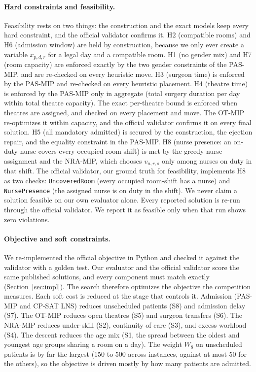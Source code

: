 \documentclass[11pt]{article}
\newcommand{\Sc}[1]{\textsf{S#1}}
\newcommand{\Hc}[1]{\textsf{H#1}}
\begin{document}
	\paragraph{Hard constraints and feasibility.}
	Feasibility rests on two things: the construction and the exact models keep every hard constraint,
	and the official validator confirms it. \Hc2 (compatible rooms) and \Hc6 (admission window) are held by
	construction, because we only ever create a variable $x_{p,d,r}$ for a legal day and a compatible
	room. \Hc1 (no gender mix) and \Hc7 (room capacity) are enforced exactly by the two gender
	constraints of the PAS-MIP, and are re-checked on every heuristic move. \Hc3 (surgeon time) is enforced by the PAS-MIP and re-checked on every heuristic placement.
	\Hc4 (theatre time) is enforced by the PAS-MIP only in aggregate (total surgery duration per day
	within total theatre capacity). The exact per-theatre bound is enforced when theatres are assigned, and checked on every placement and move. The OT-MIP re-optimizes it within capacity, and the official validator confirms it on every final solution. \Hc5 (all
	mandatory admitted) is secured by the construction, the ejection repair, and the equality
	constraint in the PAS-MIP. \Hc8 (nurse presence: an on-duty nurse covers every occupied room-shift)
	is met by the greedy nurse assignment and the NRA-MIP, which chooses $v_{n,r,s}$ only among nurses on
	duty in that shift. The official validator, our ground truth for feasibility, implements \Hc8 as two
	checks: \texttt{UncoveredRoom} (every occupied room-shift has a nurse) and \texttt{NursePresence}
	(the assigned nurse is on duty in the shift). We never claim a solution feasible on our own evaluator alone. Every reported solution is re-run through the official validator. We report it as feasible only when that run shows zero violations.
	
	\paragraph{Objective and soft constraints.}
	We re-implemented the official objective in Python and checked it against the validator with a golden test. Our evaluator and the official validator score the same published solutions, and every component must match exactly (Section~\ref{sec:impl}). The search therefore optimizes the
	objective the competition measures. Each soft cost is reduced
	at the stage that controls it. Admission (PAS-MIP and CP-SAT LNS) reduces unscheduled patients
	(\Sc8) and admission delay (\Sc7). The OT-MIP reduces open theatres (\Sc5) and surgeon transfers
	(\Sc6). The NRA-MIP reduces under-skill (\Sc2), continuity of care (\Sc3), and excess workload
	(\Sc4). The descent reduces the age mix (\Sc1, the spread between the oldest and youngest age
	groups sharing a room on a day). The weight $W_8$ on unscheduled patients is by far
	the largest (150 to 500 across instances, against at most 50 for the others), so the objective is driven mostly by how many patients are admitted.
	
\end{document}

